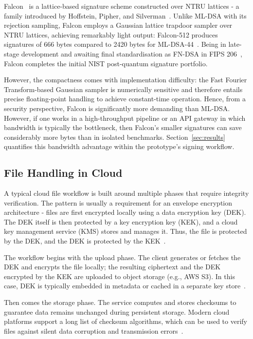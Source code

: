 \documentclass[12pt,a4paper]{article}
\begin{document}
Falcon~\cite{fouque2020fn_dsa} is a lattice-based signature scheme constructed over NTRU lattices - a family introduced by Hoffstein, Pipher, and Silverman~\cite{hoffstein1998}. Unlike ML-DSA with its rejection sampling, Falcon employs a Gaussian lattice trapdoor sampler over NTRU lattices, achieving remarkably light output: Falcon-512 produces signatures of 666 bytes compared to 2420 bytes for ML-DSA-44~\cite{nist-fips-204-2024}. Being in late-stage development and awaiting final standardisation as FN-DSA in FIPS 206~\cite{nist-fips206-2024}, Falcon completes the initial NIST post-quantum signature portfolio.

However, the compactness comes with implementation difficulty: the Fast Fourier Transform-based Gaussian sampler is numerically sensitive and therefore entails precise floating-point handling to achieve constant-time operation. Hence, from a security perspective, Falcon is significantly more demanding than ML-DSA. However, if one works in a high-throughput pipeline or an API gateway in which bandwidth is typically the bottleneck, then Falcon's smaller signatures can save considerably more bytes than in isolated benchmarks. Section~\ref{sec:results} quantifies this bandwidth advantage within the prototype's signing workflow.

\subsection{File Handling in Cloud}

A typical cloud file workflow is built around multiple phases that require integrity verification. The pattern is usually a requirement for an envelope encryption architecture - files are first encrypted locally using a data encryption key (DEK). The DEK itself is then protected by a key encryption key (KEK), and a cloud key management service (KMS) stores and manages it. Thus, the file is protected by the DEK, and the DEK is protected by the KEK~\cite{Ama24d, Goo24}.

The workflow begins with the upload phase. The client generates or fetches the DEK and encrypts the file locally; the resulting ciphertext and the DEK encrypted by the KEK are uploaded to object storage (e.g., AWS S3). In this case, DEK is typically embedded in metadata or cached in a separate key store~\cite{Ama24a, Yan24}.

Then comes the storage phase. The service computes and stores checksums to guarantee data remains unchanged during persistent storage. Modern cloud platforms support a long list of checksum algorithms, which can be used to verify files against silent data corruption and transmission errors~\cite{Ama24b, Ama24c}.
\end{document}
